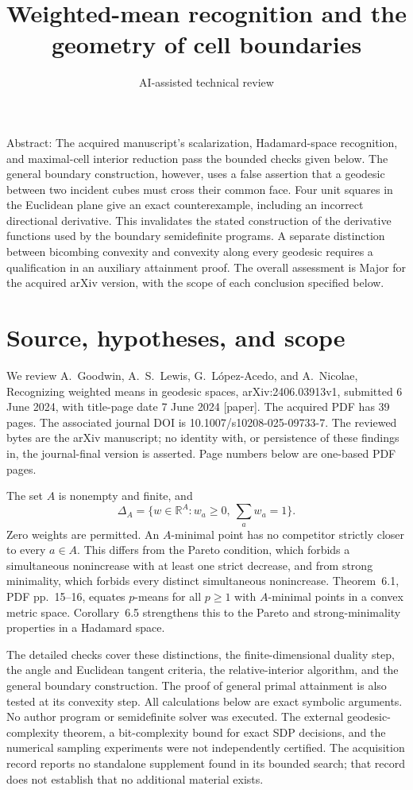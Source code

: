 \documentclass[10pt]{article}
\title{Weighted-mean recognition and the geometry of cell boundaries}
\author{AI-assisted technical review}
\date{}
\begin{document}
\maketitle
Abstract: The acquired manuscript’s scalarization, Hadamard-space recognition, and maximal-cell interior reduction pass the bounded checks given below. The general boundary construction, however, uses a false assertion that a geodesic between two incident cubes must cross their common face. Four unit squares in the Euclidean plane give an exact counterexample, including an incorrect directional derivative. This invalidates the stated construction of the derivative functions used by the boundary semidefinite programs. A separate distinction between bicombing convexity and convexity along every geodesic requires a qualification in an auxiliary attainment proof. The overall assessment is Major for the acquired arXiv version, with the scope of each conclusion specified below.\par
\section*{Source, hypotheses, and scope}
We review A. Goodwin, A. S. Lewis, G. López-Acedo, and A. Nicolae, Recognizing weighted means in geodesic spaces, arXiv:2406.03913v1, submitted 6 June 2024, with title-page date 7 June 2024 [paper]. The acquired PDF has 39 pages. The associated journal DOI is 10.1007/s10208-025-09733-7. The reviewed bytes are the arXiv manuscript; no identity with, or persistence of these findings in, the journal-final version is asserted. Page numbers below are one-based PDF pages.\par
The set \(A\) is nonempty and finite, and \[\Delta_A=\{w\in\mathbb R^A:w_a\ge0,\ \sum_a w_a=1\}.\] Zero weights are permitted. An \(A\)-minimal point has no competitor strictly closer to every \(a\in A\). This differs from the Pareto condition, which forbids a simultaneous nonincrease with at least one strict decrease, and from strong minimality, which forbids every distinct simultaneous nonincrease. Theorem 6.1, PDF pp. 15–16, equates \(p\)-means for all \(p\ge1\) with \(A\)-minimal points in a convex metric space. Corollary 6.5 strengthens this to the Pareto and strong-minimality properties in a Hadamard space.\par
The detailed checks cover these distinctions, the finite-dimensional duality step, the angle and Euclidean tangent criteria, the relative-interior algorithm, and the general boundary construction. The proof of general primal attainment is also tested at its convexity step. All calculations below are exact symbolic arguments. No author program or semidefinite solver was executed. The external geodesic-complexity theorem, a bit-complexity bound for exact SDP decisions, and the numerical sampling experiments were not independently certified. The acquisition record reports no standalone supplement found in its bounded search; that record does not establish that no additional material exists.\par
\end{document}
